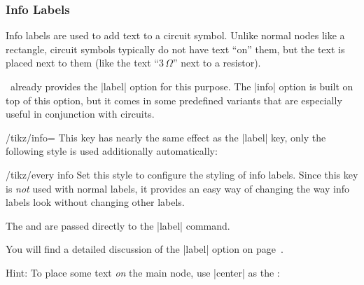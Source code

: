 \subsubsection{Info Labels}

Info labels are used to add text to a circuit symbol. Unlike normal nodes like
a rectangle, circuit symbols typically do not have text ``on'' them, but the
text is placed next to them (like the text ``$3\,\Omega$'' next to a resistor).

\tikzname\ already provides the |label| option for this purpose. The |info|
option is built on top of this option, but it comes in some predefined variants
that are especially useful in conjunction with circuits.

\begin{key}{/tikz/info=}
    This key has nearly the same effect as the |label| key, only the following
    style is used additionally automatically:
    \begin{stylekey}{/tikz/every info}
        Set this style to configure the styling of info labels. Since this
        key is \emph{not} used with normal labels, it provides an easy way
        of changing the way info labels look without changing other
        labels.
    \end{stylekey}
    The  and  are passed directly to the |label|
    command.
\begin{codeexample}[]
\begin{tikzpicture}[circuit ee IEC,every info/.style=red]
  \node [resistor,info=$3\Omega$] {};
\end{tikzpicture}
\end{codeexample}

    You will find a detailed discussion of the |label| option on
    page~\pageref{label-option}.

    Hint: To place some text \emph{on} the main node, use |center| as the
    :
\begin{codeexample}[]
\end{codeexample}
\end{key}


